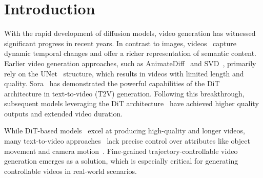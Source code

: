 

\section{Introduction}
\label{sec:intro}
With the rapid development of diffusion models, video generation has witnessed significant progress in recent years. 
In contrast to images, videos~\cite{xing2023svformer, tu2023implicit, wang2022bevt, wang2023masked} capture dynamic temporal changes and offer a richer representation of semantic content.
Earlier video generation approaches, such as AnimateDiff~\cite{guo2023animatediff} and SVD~\cite{blattmann2023stable}, primarily rely on the UNet~\cite{ronneberger2015u} structure, which results in videos with limited length and quality. 
Sora~\cite{videoworldsimulators2024} has demonstrated the powerful capabilities of the DiT~\cite{Peebles2022DiT} architecture in text-to-video (T2V) generation. 
Following this breakthrough, subsequent models leveraging the DiT architecture~\cite{zheng2024open,yang2024cogvideox,kong2024hunyuanvideo} have achieved higher quality outputs and extended video duration.

While DiT-based models~\cite{yang2024cogvideox,kong2024hunyuanvideo, zheng2024open} excel at producing high-quality and longer videos, many text-to-video approaches~\cite{guo2023animatediff, xing2024simda, xing2024survey} lack precise control over attributes like object movement and camera motion~\cite{guo2023animatediff, xing2024simda, yang2024cogvideox}.  Fine-grained trajectory-controllable video generation emerges as a solution, which is especially critical for generating controllable videos in real-world scenarios.

